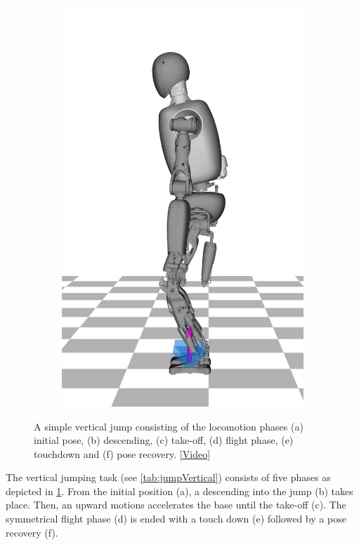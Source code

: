 \begin{figure}
\begin{subfigure}{.16\textwidth}
	\includegraphics[width=.95\linewidth]{fig/jumpVertical/snaps/6x}
	\caption{}
\end{subfigure}%
\caption[A simple vertical jump]{A simple vertical jump consisting of the locomotion phases (a) initial pose, (b) descending, (c) take-off, (d) flight phase, (e) touchdown and (f) pose recovery. \href{https://github.com/julesser/ma-thesis-simulation-results/blob/master/Jump_Vertical_10cm_NoJLims/crocoddyl_side.mp4}{[Video]}}
\label{fig:jumpVertical_Snaps}
\end{figure} 

The vertical jumping task (see \cref{tab:jumpVertical}) consists of five phases as depicted in \cref{fig:jumpVertical_Snaps}. From the initial position (a), a descending into the jump (b) takes place. Then, an upward motions accelerates the base until the take-off (c). The symmetrical flight phase (d) is ended with a touch down (e) followed by a pose recovery (f). 

